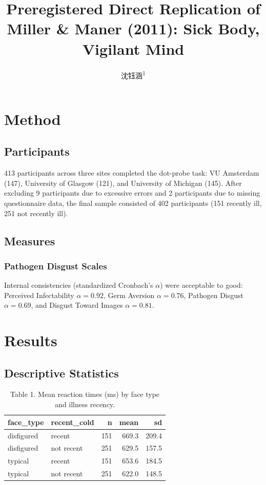 \documentclass[
  english,
  man]{apa6}
\title{Preregistered Direct Replication of Miller \& Maner (2011): Sick Body, Vigilant Mind}
\author{沈钰涵\textsuperscript{1}}
\date{}
\affiliation{\vspace{0.5cm}\textsuperscript{1} Nanjing Normal University, School of Psychology}
\begin{document}
\maketitle

\section{Method}\label{method}

\subsection{Participants}\label{participants}

413 participants across three sites completed the dot-probe task:
VU Amsterdam (147), University of Glasgow (121), and University of Michigan (145).
After excluding 9 participants due to excessive errors and 2 participants due to missing questionnaire data,
the final sample consisted of 402 participants
(151 recently ill, 251 not recently ill).

\subsection{Measures}\label{measures}

\subsubsection{Pathogen Disgust Scales}\label{pathogen-disgust-scales}

Internal consistencies (standardized Cronbach's \(\alpha\)) were acceptable to good:
Perceived Infectability \(\alpha = 0.92\), Germ Aversion \(\alpha = 0.76\),
Pathogen Disgust \(\alpha = 0.69\), and Disgust Toward Images \(\alpha = 0.81\).

\section{Results}\label{results}

\subsection{Descriptive Statistics}\label{descriptive-statistics}

\begin{table}

\caption{\label{tab:desc-table}Table 1. Mean reaction times (ms) by face type and illness recency.}
\centering
\begin{tabular}[t]{l|l|r|r|r}
\hline
face\_type & recent\_cold & n & mean & sd\\
\hline
disfigured & recent & 151 & 669.3 & 209.4\\
\hline
disfigured & not recent & 251 & 629.5 & 157.5\\
\hline
typical & recent & 151 & 653.6 & 184.5\\
\hline
typical & not recent & 251 & 622.0 & 148.5\\
\hline
\end{tabular}
\end{table}
\end{document}
